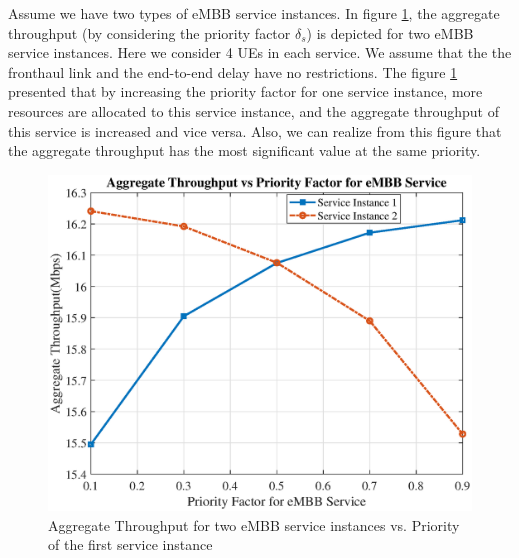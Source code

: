 \documentclass[conference]{IEEEtran}
\begin{document}
Assume we have two types of eMBB service instances. In figure \ref{fig:9}, the aggregate throughput (by considering the priority factor $\delta_s$) is depicted for two eMBB service instances. Here we consider 4 UEs in each service. We assume that the the fronthaul link and the end-to-end delay have no restrictions.
The figure \ref{fig:9} presented that by increasing the priority factor for one service instance, more resources are allocated to this service instance, and the aggregate throughput of this service is increased and vice versa. Also, we can realize from this figure that the aggregate throughput has the most significant value at the same priority.
\begin{figure}
  \centering 
    \includegraphics[scale = 0.4]{priorityLast.eps}
  \caption{Aggregate Throughput for two eMBB service instances vs. Priority of the first service instance }
  \label{fig:9}
\end{figure}
%
\end{document}
